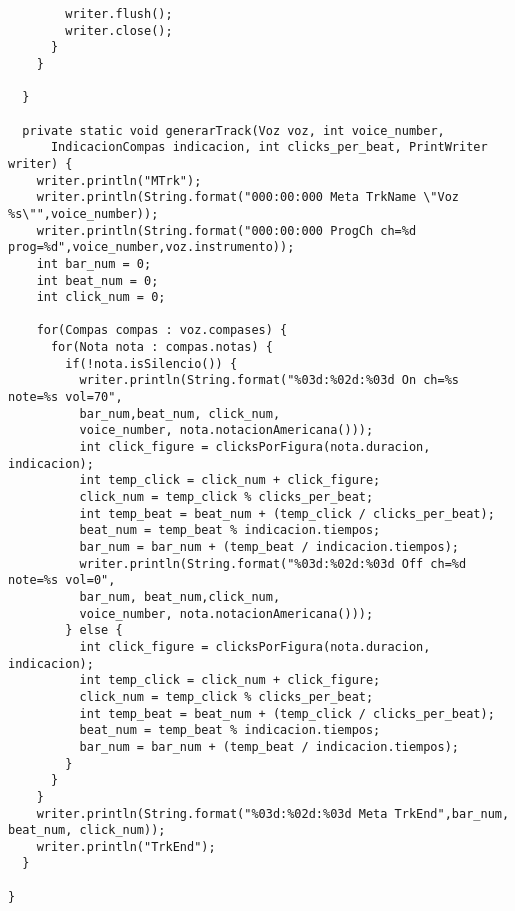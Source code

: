\begin{verbatim}
        writer.flush();
        writer.close();
      }
    }
      
  }

  private static void generarTrack(Voz voz, int voice_number,
      IndicacionCompas indicacion, int clicks_per_beat, PrintWriter writer) {
    writer.println("MTrk");
    writer.println(String.format("000:00:000 Meta TrkName \"Voz %s\"",voice_number));
    writer.println(String.format("000:00:000 ProgCh ch=%d prog=%d",voice_number,voz.instrumento));
    int bar_num = 0;
    int beat_num = 0;
    int click_num = 0;
    
    for(Compas compas : voz.compases) {
      for(Nota nota : compas.notas) {
        if(!nota.isSilencio()) {
          writer.println(String.format("%03d:%02d:%03d On ch=%s note=%s vol=70",
          bar_num,beat_num, click_num,
          voice_number, nota.notacionAmericana()));
          int click_figure = clicksPorFigura(nota.duracion, indicacion);
          int temp_click = click_num + click_figure;
          click_num = temp_click % clicks_per_beat;
          int temp_beat = beat_num + (temp_click / clicks_per_beat);
          beat_num = temp_beat % indicacion.tiempos;
          bar_num = bar_num + (temp_beat / indicacion.tiempos);
          writer.println(String.format("%03d:%02d:%03d Off ch=%d note=%s vol=0",
          bar_num, beat_num,click_num,
          voice_number, nota.notacionAmericana()));
        } else {
          int click_figure = clicksPorFigura(nota.duracion, indicacion);
          int temp_click = click_num + click_figure;
          click_num = temp_click % clicks_per_beat;
          int temp_beat = beat_num + (temp_click / clicks_per_beat);
          beat_num = temp_beat % indicacion.tiempos;
          bar_num = bar_num + (temp_beat / indicacion.tiempos);
        }        
      }
    }
    writer.println(String.format("%03d:%02d:%03d Meta TrkEnd",bar_num, beat_num, click_num));
    writer.println("TrkEnd");
  }

}
\end{verbatim}
